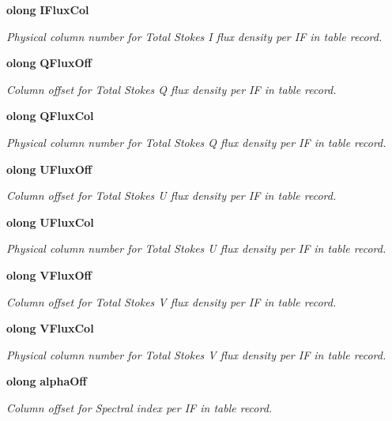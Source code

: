 \begin{CompactItemize}
{\bf olong} {\bf IFlux\-Col}
\begin{CompactList}\small\item\em Physical column number for Total Stokes I flux density per IF in table record. \item\end{CompactList}\item 
{\bf olong} {\bf QFlux\-Off}
\begin{CompactList}\small\item\em Column offset for Total Stokes Q flux density per IF in table record. \item\end{CompactList}\item 
{\bf olong} {\bf QFlux\-Col}
\begin{CompactList}\small\item\em Physical column number for Total Stokes Q flux density per IF in table record. \item\end{CompactList}\item 
{\bf olong} {\bf UFlux\-Off}
\begin{CompactList}\small\item\em Column offset for Total Stokes U flux density per IF in table record. \item\end{CompactList}\item 
{\bf olong} {\bf UFlux\-Col}
\begin{CompactList}\small\item\em Physical column number for Total Stokes U flux density per IF in table record. \item\end{CompactList}\item 
{\bf olong} {\bf VFlux\-Off}
\begin{CompactList}\small\item\em Column offset for Total Stokes V flux density per IF in table record. \item\end{CompactList}\item 
{\bf olong} {\bf VFlux\-Col}
\begin{CompactList}\small\item\em Physical column number for Total Stokes V flux density per IF in table record. \item\end{CompactList}\item 
{\bf olong} {\bf alpha\-Off}
\begin{CompactList}\small\item\em Column offset for Spectral index per IF in table record. \item\end{CompactList}\item 

\end{CompactItemize}
